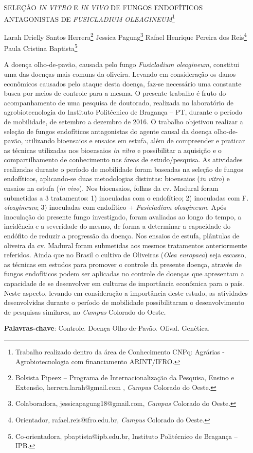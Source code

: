 \documentclass[article,12pt,onesidea,4paper,english,brazil]{abntex2}
\begin{document}
	
	
	\frenchspacing 
	
	\begin{center}
		\LARGE SELEÇÃO \textit{IN VITRO} E \textit{IN VIVO} DE FUNGOS ENDOFÍTICOS ANTAGONISTAS DE \textit{FUSICLADIUM OLEAGINEUM}\footnote{Trabalho realizado dentro da área de Conhecimento CNPq: Agrárias - Agrobiotecnologia com financiamento ARINT/IFRO.}
		
		\normalsize
		Larah Drielly Santos Herrera\footnote{Bolsista Pipeex – Programa de Internacionalização da Pesquisa, Ensino e Extensão, herrera.larah@gmail.com , \textit{Campus} Colorado do Oeste.} 
		Jessica Pagung\footnote{Colaboradora, jessicapagung18@gmail.com, \textit{Campus} Colorado do Oeste.} 
		Rafael Henrique Pereira dos Reis\footnote{Orientador, rafael.reis@ifro.edu.br, \textit{Campus} Colorado do Oeste.} 
		Paula Cristina Baptista\footnote{Co-orientadora, pbaptista@ipb.edu.br, Instituto Politécnico de Bragança – IPB.} 
	\end{center}
	
	\noindent A doença olho-de-pavão, causada pelo fungo \textit{Fusicladium oleagineum}, constitui uma das doenças mais comuns da oliveira. Levando em consideração os danos econômicos causados pelo ataque desta doença, faz-se necessário uma constante busca por meios de controle para a mesma. O presente trabalho é fruto do	acompanhamento de uma pesquisa de doutorado, realizada no laboratório de agrobiotecnologia do Instituto Politécnico de Bragança – PT, durante o período de mobilidade, de setembro a dezembro de 2016. O trabalho objetivou realizar a
	seleção de fungos endofíticos antagonistas do agente causal da doença olho-de-
	pavão, utilizando bioensaios e ensaios em estufa, além de compreender e praticar
	as técnicas utilizadas nos bioensaios \textit{in vitro} e possibilitar a aquisição e o
	compartilhamento de conhecimento nas áreas de estudo/pesquisa. As atividades
	realizadas durante o período de mobilidade foram baseadas na seleção de fungos
	endofíticos, aplicando-se duas metodologias distintas: bioensaios (\textit{in vitro}) e ensaios	na estufa (\textit{in vivo}). Nos bioensaios, folhas da cv. Madural foram submetidas a 3 tratamentos: 1) inoculadas com o endofítico; 2) inoculadas com F. \textit{oleagineum}; 3)
	inoculadas com endofítico + \textit{Fusicladium oleagineum}. Após inoculação do presente
	fungo investigado, foram avaliadas ao longo do tempo, a incidência e a severidade
	do mesmo, de forma a determinar a capacidade do endófito de reduzir a progressão
	da doença. Nos ensaios de estufa, plântulas de oliveira da cv. Madural foram
	submetidas aos mesmos tratamentos anteriormente referidos. Ainda que no Brasil o
	cultivo de Oliveiras (\textit{Olea europaea}) seja escasso, as técnicas em estudos para
	promover o controle da presente doença, através de fungos endofíticos podem ser
	aplicadas no controle de doenças que apresentam a capacidade de se desenvolver
	em culturas de importância econômica para o país. Neste aspecto, levando em
	consideração a importância deste estudo, as atividades desenvolvidas durante o
	período de mobilidade possibilitaram o desenvolvimento de pesquisas similares, no
	\textit{Campus} Colorado do Oeste.
	
	\vspace{\onelineskip}
	
	\noindent
	\textbf{Palavras-chave}: Controle. Doença Olho-de-Pavão. Olival. Genética.
	
\end{document}
